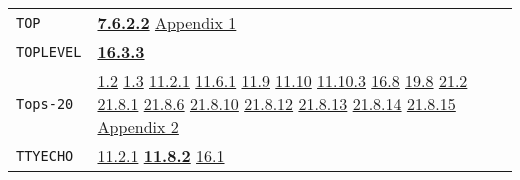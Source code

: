 \documentclass[a4paper,]{article}
\begin{document}
\begin{longtable}[]{@{}ll@{}}
\begin{minipage}[t]{0.24\columnwidth}\raggedright\strut
\texttt{TOP}\strut
\end{minipage} & \begin{minipage}[t]{0.70\columnwidth}\raggedright\strut
\textbf{\href{07-structured-objects.md\#7622-top-1}{7.6.2.2}}
\href{appendix-1-a-look-inside.md\#basic-data-structures}{Appendix 1}\strut
\end{minipage}\tabularnewline
\begin{minipage}[t]{0.24\columnwidth}\raggedright\strut
\texttt{TOPLEVEL}\strut
\end{minipage} & \begin{minipage}[t]{0.70\columnwidth}\raggedright\strut
\textbf{\href{16-errors-frames-etc.md\#1633-frame-the-subr}{16.3.3}}\strut
\end{minipage}\tabularnewline
\begin{minipage}[t]{0.24\columnwidth}\raggedright\strut
\texttt{Tops-20}\strut
\end{minipage} & \begin{minipage}[t]{0.70\columnwidth}\raggedright\strut
\href{01-basic-introduction.md\#12-typing-1}{1.2} \href{01-basic-introduction.md\#13-loading-a-file-1}{1.3}
\href{11-input-output.md\#1121-open}{11.2.1} \href{11-input-output.md\#1161-save}{11.6.1}
\href{11-input-output.md\#119-internal-channels}{11.9}
\href{11-input-output.md\#1110-the-net-device-the-arpa-network}{11.10} \href{11-input-output.md\#11103-nets}{11.10.3}
\href{16-errors-frames-etc.md\#168-control-s-s}{16.8} \href{19-compiled-programs.md\#198-rsubrs-in-files}{19.8}
\href{21-interrupts.md\#212-event}{21.2} \href{21-interrupts.md\#2181-char-received}{21.8.1}
\href{21-interrupts.md\#2186-clock}{21.8.6} \href{21-interrupts.md\#21810-sysdown}{21.8.10}
\href{21-interrupts.md\#21812-ipc}{21.8.12} \href{21-interrupts.md\#21813-inferior}{21.8.13}
\href{21-interrupts.md\#21814-runt-and-realt}{21.8.14} \href{21-interrupts.md\#21815-dangerous-interrupts}{21.8.15}
\href{appendix-2-predefined-subroutines.md\#appendix-2-predefined-subroutines}{Appendix 2}\strut
\end{minipage}\tabularnewline
\begin{minipage}[t]{0.24\columnwidth}\raggedright\strut
\texttt{TTYECHO}\strut
\end{minipage} & \begin{minipage}[t]{0.70\columnwidth}\raggedright\strut
\href{11-input-output.md\#1121-open}{11.2.1} \textbf{\href{11-input-output.md\#1182-ttyecho}{11.8.2}}
\href{16-errors-frames-etc.md\#161-listen}{16.1}\strut

\end{minipage}
\end{longtable}
\end{document}
